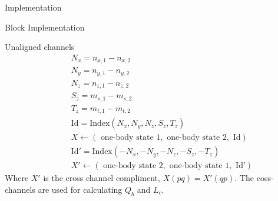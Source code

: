 \documentclass[twoside,english]{uiofysmaster}
\begin{document}
\begin{chapter}{Implementation}
\begin{section}{Block Implementation}
\begin{subsection}{Unaligned channels}
\begin{align*}
				&\:\:\:\:\:\: N_x = n_{x,1} - n_{x,2} \\
				&\:\:\:\:\:\: N_y = n_{y,1} - n_{y,2} \\
				&\:\:\:\:\:\: N_z = n_{z,1} - n_{z,2} \\
 				&\:\:\:\:\:\: S_z = m_{s,1} - m_{s,2} \\
				&\:\:\:\:\:\: T_z = m_{t,1} - m_{t,2} \\
				&\:\:\:\:\:\: \text{Id} = \text{Index}(N_x,N_y,N_z,S_z,T_z) \\
				&\:\:\:\:\:\: X \leftarrow (\text{ one-body state 1}, \text{ one-body state 2}, \text{ Id}) \\
				&\:\:\:\:\:\: \text{Id}' = \text{Index}(-N_x,-N_y,-N_z,-S_z,-T_z) \\
				&\:\:\:\:\:\: X' \leftarrow (\text{ one-body state 2}, \text{ one-body state 1}, \text{ Id'})
			\end{align*}
			Where $X'$ is the cross channel compliment, $X(pq) = X'(qp)$. The coss-channels are used for calculating $Q_b$ and $L_c$. 


\end{subsection}
\end{section}
\end{chapter}
\end{document}
